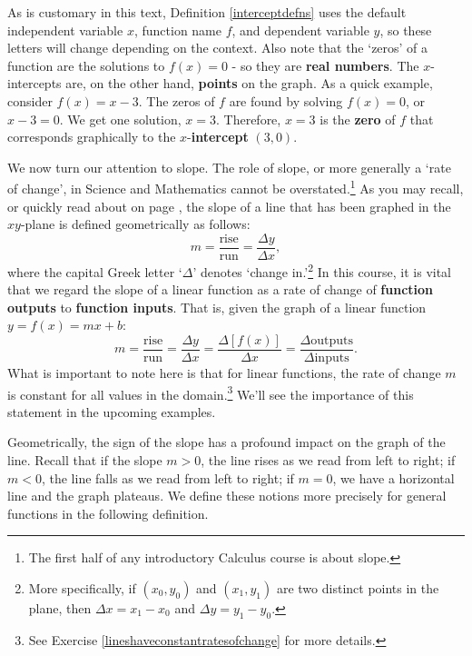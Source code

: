 \documentclass{ximera}
\begin{document}



As is customary in this text, Definition \ref{interceptdefns} uses the default independent variable $x$, function name $f$, and dependent variable $y$, so these letters will change depending on the context.  Also note that the `zeros' of a function are the solutions to $f(x) = 0$ - so they are \textbf{real numbers}.  The $x$-intercepts are, on the other hand, \textbf{points} on the graph.  As a quick example, consider $f(x) = x-3$.  The zeros of $f$ are found by solving $f(x) = 0$, or $x-3=0$.  We get one solution, $x = 3$.  Therefore, $x=3$ is the \textbf{zero} of $f$ that corresponds graphically to the $x$-\textbf{intercept} $(3,0)$.  



We now turn our attention to slope.  The role of slope, or more generally a `rate of change',  in Science and Mathematics  cannot be overstated.\footnote{The first half of any introductory Calculus course is about slope.} As you may recall, or quickly read about on page \pageref{slope}, the slope of a line that has been graphed in the $xy$-plane is defined geometrically as follows: \[m = \dfrac{\text{rise}}{\text{run}} = \dfrac{\Delta y}{\Delta x} ,\] where the capital Greek letter  `$\Delta$' denotes `change in.'\footnote{More specifically, if $(x_{0}, y_{0})$ and $(x_{1}, y_{1})$ are two distinct points in the plane, then $\Delta x = x_{1} - x_{0}$ and $\Delta y = y_{1} - y_{0}$.} In this course, it is vital that we regard the slope of a linear function as a  rate of change of \textbf{function outputs}  to \textbf{function inputs}.  That is, given the graph of a linear function $y = f(x) = mx + b$:   \[ m = \dfrac{\text{rise}}{\text{run}} = \dfrac{\Delta y}{\Delta x} = \dfrac{\Delta [f(x)]}{\Delta x} = \dfrac{\Delta \text{outputs}}{\Delta \text{inputs}}. \]  What is important to note here is that for linear functions, the rate of change $m$ is constant for all values in the domain.\footnote{See Exercise \ref{lineshaveconstantratesofchange} for more details.}  We'll see the importance of this statement in the upcoming examples.



Geometrically, the sign of the slope has a profound impact on the graph of the line.  Recall that if the slope $m > 0$, the line rises as we read from left to right;   if $m<0$, the line falls as we read from left to right; if $m=0$, we have a horizontal line and the graph plateaus.  We define these notions more precisely for general functions in the following definition.
\end{document}
